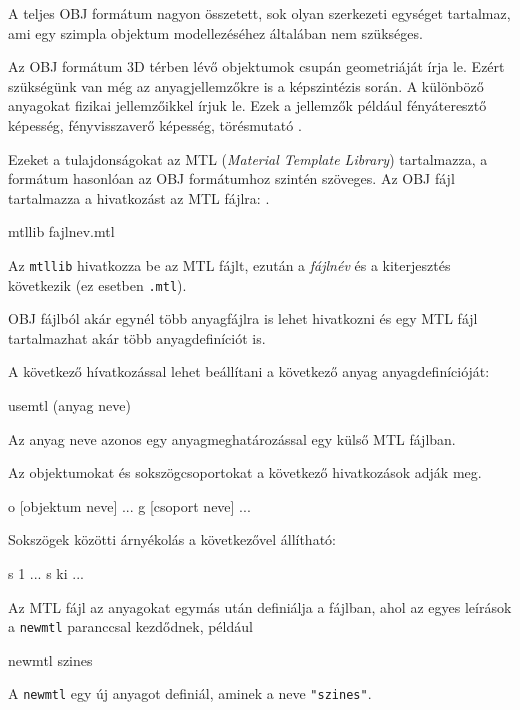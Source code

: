 A teljes OBJ formátum nagyon összetett, sok olyan szerkezeti egységet tartalmaz, ami egy szimpla objektum modellezéséhez általában nem szükséges.


Az OBJ formátum 3D térben lévő objektumok csupán geometriáját írja le. Ezért szükségünk van még az anyagjellemzőkre is a képszintézis során. A különböző anyagokat fizikai jellemzőikkel írjuk le. Ezek a jellemzők például fényáteresztő képesség, fényvisszaverő képesség, törésmutató \cite{diane1995mtl}.


Ezeket a tulajdonságokat az MTL (\textit{Material Template Library}) tartalmazza, a formátum hasonlóan az OBJ formátumhoz szintén szöveges. Az OBJ fájl tartalmazza a hivatkozást az {MTL} fájlra: \cite{diane1995mtl}.
\begin{python}
mtllib fajlnev.mtl
\end{python}
Az \texttt{mtllib} hivatkozza be az MTL fájlt, ezután a \textsl{fájlnév} és a kiterjesztés következik (ez esetben \texttt{.mtl}).

OBJ fájlból akár egynél több anyagfájlra is lehet hivatkozni és egy MTL fájl tartalmazhat akár több anyagdefiníciót is.

A következő hívatkozással lehet beállítani a következő anyag anyagdefinícióját:
\begin{python}
usemtl (anyag neve)
\end{python}
Az anyag neve azonos egy anyagmeghatározással egy külső MTL fájlban.

Az objektumokat és sokszögcsoportokat a következő hivatkozások adják meg.
\begin{python}
o [objektum neve]
  ...
  g [csoport neve]
  ...
\end{python}

Sokszögek közötti árnyékolás a következővel állítható:
\begin{python}
s 1
  ...
  s ki
  ...
\end{python}


Az MTL fájl az anyagokat egymás után definiálja a fájlban, ahol az egyes leírások a \texttt{newmtl} paranccsal kezdődnek, például
\begin{python}
newmtl szines
\end{python}
A \texttt{newmtl} egy új anyagot definiál, aminek a neve \texttt{"szines"}.


